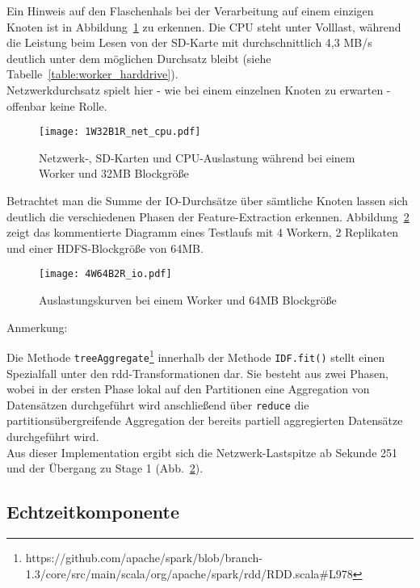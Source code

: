 Ein Hinweis auf den Flaschenhals bei der Verarbeitung auf einem einzigen Knoten ist in Abbildung~\ref{figure:1W32B1R_net_cpu} zu erkennen. Die CPU steht unter Volllast, während die Leistung beim Lesen von der SD-Karte mit durchschnittlich 4,3 MB/s deutlich unter dem möglichen Durchsatz bleibt (siehe Tabelle~\ref{table:worker_harddrive}).\\
Netzwerkdurchsatz spielt hier - wie bei einem einzelnen Knoten zu erwarten - offenbar keine Rolle.

\begin{figure}[ht!]
	\centering
  \texttt{[image: 1W32B1R\_net\_cpu.pdf]}
	\caption{Netzwerk-, SD-Karten und CPU-Auslastung während bei einem Worker und 32MB Blockgröße}
	\label{figure:1W32B1R_net_cpu}
\end{figure}

Betrachtet man die Summe der IO-Durchsätze über sämtliche Knoten lassen sich deutlich die verschiedenen Phasen der Feature-Extraction erkennen. Abbildung~\ref{figure:4W64B2R_io} zeigt das kommentierte Diagramm eines Testlaufs mit 4 Workern, 2 Replikaten und einer HDFS-Blockgröße von 64MB.

\begin{figure}[ht!]
	\centering
  \texttt{[image: 4W64B2R\_io.pdf]}
	\caption{Auslastungskurven bei einem Worker und 64MB Blockgröße}
	\label{figure:4W64B2R_io}
\end{figure}

\begin{labeling}{Anmerkung:~}
\item[Anmerkung:] Die Methode \lstinline|treeAggregate|\footnote{https://github.com/apache/spark/blob/branch-1.3/core/src/main/scala/org/apache/spark/rdd/RDD.scala\#L978} innerhalb der Methode \lstinline|IDF.fit()| stellt einen Spezialfall unter den \gls{rdd}-Transformationen dar. Sie besteht aus zwei Phasen, wobei in der ersten Phase lokal auf den Partitionen eine Aggregation von Datensätzen durchgeführt wird anschließend über \lstinline|reduce| die partitionsübergreifende Aggregation der bereits partiell aggregierten Datensätze durchgeführt wird.\\
Aus dieser Implementation ergibt sich die Netzwerk-Lastspitze ab Sekunde 251 und der Übergang zu Stage 1 (Abb.~\ref{figure:4W64B2R_io}).
\end{labeling}

\subsection{Echtzeitkomponente}

